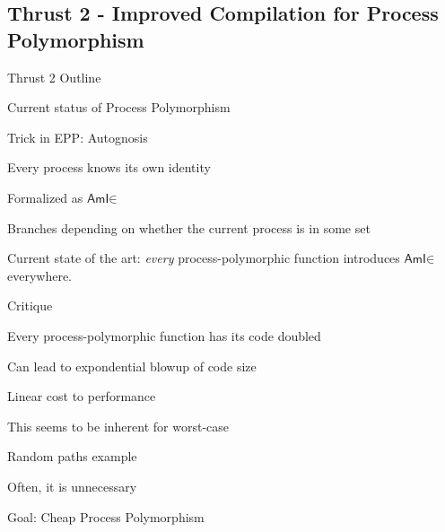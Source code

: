 \subsection{Thrust 2 - Improved Compilation for Process Polymorphism}
\label{sec:t2}

\newcommand{\AmIinName}{\ensuremath{\textsf{AmI}\mathord{\in}}}
\newcommand{\AmIin}[3]{\ensuremath{\AmIinName\mkern5mu#1 \mathop{\textsf{?}} #2 \mathop{\textsf{:}} #3}}
\newcommand{\AmIName}{\textsf{AmI}}
\newcommand{\AmI}[3]{\ensuremath{\AmIName\mkern5mu#1 \mathop{\textsf{?}} #2 \mathop{\textsf{:}} #3}}

\iffalse
\begin{outline}{Thrust 2 Outline}
\item Current status of Process Polymorphism
  \begin{lvl}
  \item Trick in EPP: Autognosis
    \begin{lvl}
    \item Every process knows its own identity
    \end{lvl}
  \item Formalized as $\AmIinName$
    \begin{lvl}
    \item Branches depending on whether the current process is in some set
    \end{lvl}
  \item Current state of the art: \emph{every} process-polymorphic function introduces $\AmIinName$ everywhere.
  \end{lvl}
\item Critique
  \begin{lvl}
  \item Every process-polymorphic function has its code doubled
    \begin{lvl}
    \item Can lead to expondential blowup of code size
    \item Linear cost to performance
    \end{lvl}
  \item This seems to be inherent for worst-case
    \begin{lvl}
    \item Random paths example
    \end{lvl}
  \item Often, it is unnecessary
  \end{lvl}
\item Goal: Cheap Process Polymorphism

\end{outline}
